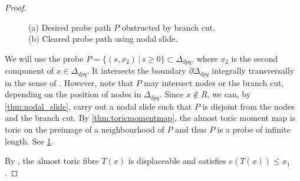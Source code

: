 \documentclass[AIF,Unicode,manuscript]{cedram}
\begin{document}
\begin{proof}
\begin{figure}
\centering
{}
\caption{(a) Desired probe path $P$ obstructed by branch cut.\\(b) Cleared probe path using nodal slide.}
\label{fig:clear_the_probe}
\end{figure}
We will use the probe $P = \{(s,x_2) \, \vert \, s ≥ 0\} \subset \Delta_{dpq}$, where $x_2$ is the second component of $x \in \Delta_{dpq}$.
It intersects the boundary $∂ \Delta_{dpq}$ integrally transversally in the sense of \cite[Section 2.1]{mcduff2011displacing}.
However, note that $P$ may intersect nodes or the branch cut, depending on the position of nodes in $\Delta_{dpq}$.
Since $x ∉ R$, we can, by \cref{thm:nodal_slide}, carry out a nodal slide such that $P$ is disjoint from the nodes and the branch cut.
By \cref{thm:toricmomentmap}, the almost toric moment map is toric on the preimage of a neighbourhood of $P$ and thus $P$ is a probe of infinite length.
See \cref{fig:clear_the_probe}.

By \cite[Proposition 3.4]{brendel2020real}, the almost toric fibre $T(x)$ is displaceable and satisfies $e(T(x)) ≤ x_1$.
\end{proof}
\end{document}
